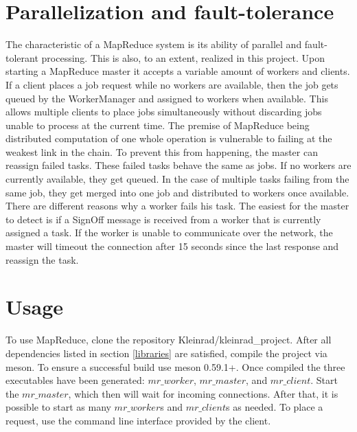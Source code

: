 \documentclass[12pt, letterpaper]{article}
\begin{document}
\section{Parallelization and fault-tolerance}

The characteristic of a MapReduce system is its ability of parallel and fault-tolerant processing. This is also, to an extent, realized in this project.\newline
Upon starting a MapReduce master it accepts a variable amount of workers and clients. If a client places a job request while no workers are available, then the job gets queued by the WorkerManager and assigned to workers when available. This allows multiple clients to place jobs simultaneously without discarding jobs unable to process at the current time.\newline
The premise of MapReduce being distributed computation of one whole operation is vulnerable to failing at the weakest link in the chain. To prevent this from happening, the master can reassign failed tasks. These failed tasks behave the same as jobs. If no workers are currently available, they get queued. In the case of multiple tasks failing from the same job, they get merged into one job and distributed to workers once available.\newline
There are different reasons why a worker fails his task. The easiest for the master to detect is if a SignOff message is received from a worker that is currently assigned a task. If the worker is unable to communicate over the network, the master will timeout the connection after 15 seconds since the last response and reassign the task. 

\section{Usage}
\label{usage}

To use MapReduce, clone the repository Kleinrad/kleinrad\_project. After all dependencies listed in section \ref{libraries} are satisfied, compile the project via meson. To ensure a successful build use meson 0.59.1+. Once compiled the three executables have been generated: $mr\_worker$, $mr\_master$, and $mr\_client$.\newline
Start the $mr\_master$, which then will wait for incoming connections. After that, it is possible to start as many $mr\_worker$s and $mr\_client$s as needed. To place a request, use the command line interface provided by the client.
\end{document}

